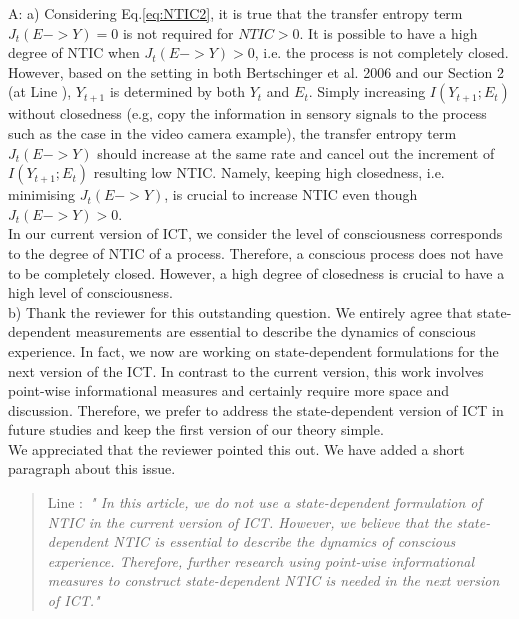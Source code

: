\documentclass[utf8]{article}
\newenvironment{ans}  
    {\color{Black}\noindent A:}
    {~\newline}
\newcommand{\addnew}[2]{\blockcquote{}{Line #1:~\newline\textit{"#2"}}
}
\begin{document}
    	\begin{ans}
    		\newline
    		a) Considering Eq.\ref{eq:NTIC2}, it is true that the transfer entropy term $J_t(E -> Y)=0$ is not required for $NTIC>0$. It is possible to have a high degree of NTIC when $J_t(E -> Y) > 0$, i.e. the process is not completely closed.  \\
    		However, based on the setting in both Bertschinger et al. 2006 and our Section 2 (at Line ), $Y_{t+1}$ is determined by both $Y_t$ and $E_t$. Simply increasing $I(Y_{t+1}; E_t)$ without closedness (e.g, copy the information in sensory signals to the process such as the case in the video camera example), the transfer entropy term $J_t(E -> Y)$ should increase at the same rate and cancel out the increment of $I(Y_{t+1}; E_t)$ resulting low NTIC. Namely, keeping high closedness, i.e. minimising $J_t(E -> Y)$, is crucial to increase NTIC even though $J_t(E -> Y) > 0$.\\
    		In our current version of ICT, we consider the level of consciousness corresponds to the degree of NTIC of a process. Therefore, a conscious process does not have to be completely closed. However, a high degree of closedness is crucial to have a high level of consciousness.\\
    		
    		\noindent
    		b) Thank the reviewer for this outstanding question. We entirely agree that state-dependent measurements are essential to describe the dynamics of conscious experience. In fact, we now are working on state-dependent formulations for the next version of the ICT. In contrast to the current version, this work involves point-wise informational measures and certainly require more space and discussion. Therefore, we prefer to address the state-dependent version of ICT in future studies and keep the first version of our theory simple.\\
    		We appreciated that the reviewer pointed this out. We have added a short paragraph about this issue.
    	
	    	\addnew{}{
	    		In this article, we do not use a state-dependent formulation of NTIC in the current version of ICT. However, we believe that the state-dependent NTIC is essential to describe the dynamics of conscious experience. Therefore, further research using point-wise informational measures to construct state-dependent NTIC is needed in the next version of ICT.}
	    	
	    		
	    		
    	\end{ans}
        
\end{document}
